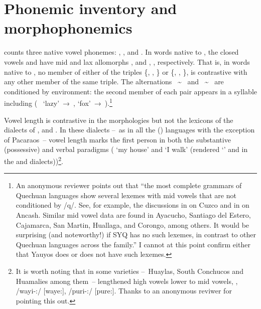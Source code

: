 {\section{Phonemic inventory and morphophonemics}\label{sec:phoinvmor}
\SYQ{} counts three native vowel phonemes: , , and . In words native to \SYQ, the closed vowels  and  have mid and lax allomorphs \textipa{[e]}, \textipa{[ɪ]} and \textipa{[o]}, \textipa{[υ]}, respectively. That is, in words native to \SYQ, no member of either of the triples \{\textipa{[i]}, \textipa{[e]}, \textipa{[ɪ]}\} or \{\textipa{[u]}, \textipa{[o]}, \textipa{[υ]}\}, is contrastive with any other member of the same triple. The alternations \textipa{[i]}~\textasciitilde~\textipa{[e]} and \textipa{[u]}~\textasciitilde~\textipa{[o]} are conditioned by environment: the second member of each pair appears in a syllable including  ( \ ‘lazy’~→~\textipa{[qeλa]},  ‘fox’~→~\textipa{[atoq]}).\footnote{An anonymous reviewer points out that “the most complete grammars of Quechuan languages show several lexemes with mid vowels that are not conditioned by /q/. See, for example, the discussions in \citet[46--51]{Cusihuaman76} on Cuzco and in \citet[xiv--xv]{swisshelm1972} on Ancash. Similar mid vowel data are found in Ayacucho, Santiago del Estero, Cajamarca, San Martin, Huallaga, and Corongo, among others. It would be surprising (and noteworthy!) if SYQ has no such lexemes, in contrast to other Quechuan languages across the family.” I cannot at this point confirm either that Yauyos does or does not have such lexemes.}

Vowel length is contrastive in the morphologies but not the lexicons of the dialects of \ACH, \CH{} and \SP. In these dialects --~as in all the \QI{} (\QB) languages with the exception of Pacaraos~-- vowel length marks the first person in both the substantive (possessive) and verbal paradigms ( ‘my house’ and  ‘I walk’ (rendered ‘’ and  in the \AMV{} and \LT{} dialects))\footnote{It is worth noting that in some \QI{} varieties --~Huaylas, South Conchucos and Huamalies among them~-- lengthened high vowels lower to mid vowels, \eg, /wayi-:/ [waye:], /puri-:/ [pure:]. Thanks to an anonymous reviwer for pointing this out.}. 

}

